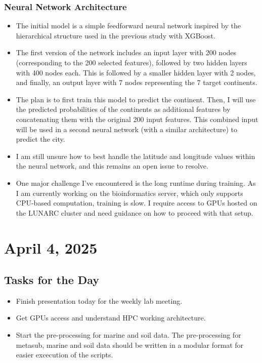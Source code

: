 \documentclass{article}
\begin{document}
\subsubsection*{Neural Network Architecture}
\begin{itemize}
    \item The initial model is a simple feedforward neural network inspired by the hierarchical structure used in the previous study with XGBoost.
    \item The first version of the network includes an input layer with 200 nodes (corresponding to the 200 selected features), followed by two hidden layers with 400 nodes each. This is followed by a smaller hidden layer with 2 nodes, and finally, an output layer with 7 nodes representing the 7 target continents.
    \item The plan is to first train this model to predict the continent. Then, I will use the predicted probabilities of the continents as additional features by concatenating them with the original 200 input features. This combined input will be used in a second neural network (with a similar architecture) to predict the city.
    \item I am still unsure how to best handle the latitude and longitude values within the neural network, and this remains an open issue to resolve.
    \item One major challenge I’ve encountered is the long runtime during training. As I am currently working on the bioinformatics server, which only supports CPU-based computation, training is slow. I require access to GPUs hosted on the LUNARC cluster and need guidance on how to proceed with that setup.
\end{itemize}

\section{April 4, 2025}

\subsection*{Tasks for the Day}
\begin{itemize}
    \item Finish presentation today for the weekly lab meeting.
    \item Get GPUs access and understand HPC working architecture. 
    \item Start the pre-processing for marine and soil data. The pre-processing for metasub, marine and soil data should be written in a modular format for easier excecution of the scripts.
\end{itemize}
\end{document}
